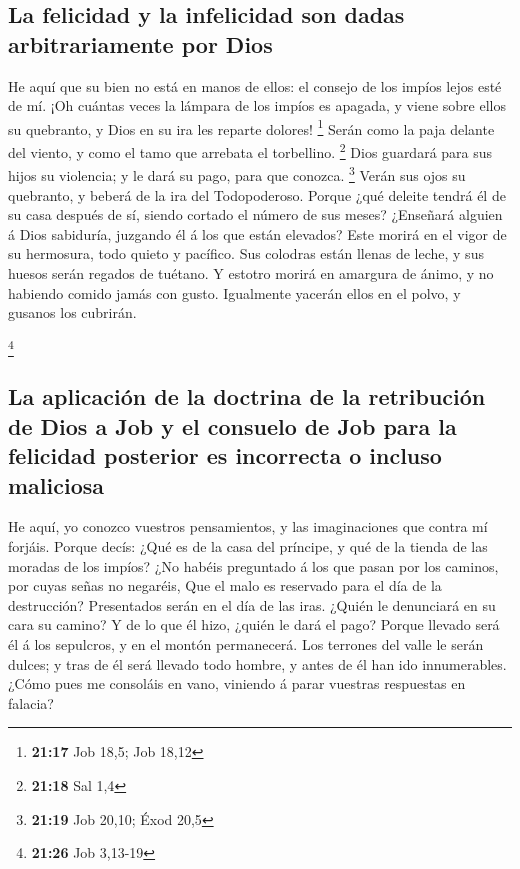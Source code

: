 \hypertarget{la-felicidad-y-la-infelicidad-son-dadas-arbitrariamente-por-dios}{%
\subsection{La felicidad y la infelicidad son dadas arbitrariamente por
Dios}\label{la-felicidad-y-la-infelicidad-son-dadas-arbitrariamente-por-dios}}

 He aquí que su bien no está en manos de ellos: el consejo
de los impíos lejos esté de mí.  ¡Oh cuántas veces la
lámpara de los impíos es apagada, y viene sobre ellos su quebranto, y
Dios en su ira les reparte dolores! \footnote{\textbf{21:17} Job 18,5;
  Job 18,12}  Serán como la paja delante del viento, y como
el tamo que arrebata el torbellino. \footnote{\textbf{21:18} Sal 1,4}
 Dios guardará para sus hijos su violencia; y le dará su
pago, para que conozca. \footnote{\textbf{21:19} Job 20,10; Éxod 20,5}
 Verán sus ojos su quebranto, y beberá de la ira del
Todopoderoso.  Porque ¿qué deleite tendrá él de su casa
después de sí, siendo cortado el número de sus meses? 
¿Enseñará alguien á Dios sabiduría, juzgando él á los que están
elevados?  Este morirá en el vigor de su hermosura, todo
quieto y pacífico.  Sus colodras están llenas de leche, y
sus huesos serán regados de tuétano.  Y estotro morirá en
amargura de ánimo, y no habiendo comido jamás con gusto. 
Igualmente yacerán ellos en el polvo, y gusanos los cubrirán.

\footnote{\textbf{21:26} Job 3,13-19}

\hypertarget{la-aplicaciuxf3n-de-la-doctrina-de-la-retribuciuxf3n-de-dios-a-job-y-el-consuelo-de-job-para-la-felicidad-posterior-es-incorrecta-o-incluso-maliciosa}{%
\subsection{La aplicación de la doctrina de la retribución de Dios a Job
y el consuelo de Job para la felicidad posterior es incorrecta o incluso
maliciosa}\label{la-aplicaciuxf3n-de-la-doctrina-de-la-retribuciuxf3n-de-dios-a-job-y-el-consuelo-de-job-para-la-felicidad-posterior-es-incorrecta-o-incluso-maliciosa}}

 He aquí, yo conozco vuestros pensamientos, y las
imaginaciones que contra mí forjáis.  Porque decís: ¿Qué es
de la casa del príncipe, y qué de la tienda de las moradas de los
impíos?  ¿No habéis preguntado á los que pasan por los
caminos, por cuyas señas no negaréis,  Que el malo es
reservado para el día de la destrucción? Presentados serán en el día de
las iras.  ¿Quién le denunciará en su cara su camino? Y de
lo que él hizo, ¿quién le dará el pago?  Porque llevado
será él á los sepulcros, y en el montón permanecerá.  Los
terrones del valle le serán dulces; y tras de él será llevado todo
hombre, y antes de él han ido innumerables.  ¿Cómo pues me
consoláis en vano, viniendo á parar vuestras respuestas en falacia?

